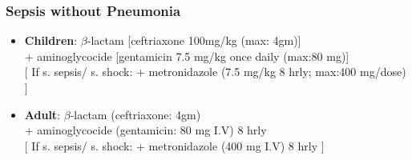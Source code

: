 \documentclass[11pt,a4paper]{report}
\begin{document}
\subsubsection{Sepsis without Pneumonia}
\begin{itemize}
	\item \textbf{Children}: $\beta$-lactam [ceftriaxone 100mg/kg (max: 4gm)] \\
	+ aminoglycocide [gentamicin 7.5 mg/kg once daily (max:80 mg)] \\
	$[$ If s. sepsis/ s. shock: + metronidazole (7.5 mg/kg 8 hrly; max:400 mg/dose) $]$
	\item \textbf{Adult}: $\beta$-lactam (ceftriaxone: 4gm) \\
	+ aminoglycocide (gentamicin: 80 mg I.V) 8 hrly \\
	$[$ If s. sepsis/ s. shock: + metronidazole (400 mg I.V) 8 hrly $]$
\end{itemize}
\end{document}

